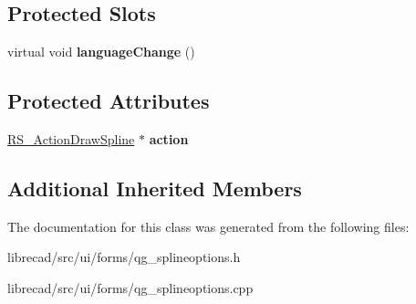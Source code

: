 \subsection*{Protected Slots}
\begin{DoxyCompactItemize}
\item 
\hypertarget{classQG__SplineOptions_a0ec01181fb2a40a4ef178b346a629038}{virtual void {\bfseries language\-Change} ()}\label{classQG__SplineOptions_a0ec01181fb2a40a4ef178b346a629038}

\end{DoxyCompactItemize}
\subsection*{Protected Attributes}
\begin{DoxyCompactItemize}
\item 
\hypertarget{classQG__SplineOptions_a64e65688edd98d143c5669f615c27e95}{\hyperlink{classRS__ActionDrawSpline}{R\-S\-\_\-\-Action\-Draw\-Spline} $\ast$ {\bfseries action}}\label{classQG__SplineOptions_a64e65688edd98d143c5669f615c27e95}

\end{DoxyCompactItemize}
\subsection*{Additional Inherited Members}


The documentation for this class was generated from the following files\-:\begin{DoxyCompactItemize}
\item 
librecad/src/ui/forms/qg\-\_\-splineoptions.\-h\item 
librecad/src/ui/forms/qg\-\_\-splineoptions.\-cpp\end{DoxyCompactItemize}
